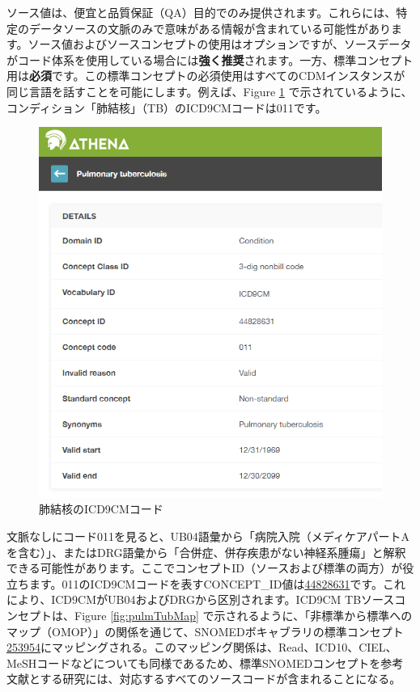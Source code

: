 \documentclass[
  11pt]{book}
\theoremstyle{definition}
\theoremstyle{definition}
\theoremstyle{definition}
\theoremstyle{definition}
\theoremstyle{remark}
\begin{document}
ソース値は、便宜と品質保証（QA）目的でのみ提供されます。これらには、特定のデータソースの文脈のみで意味がある情報が含まれている可能性があります。ソース値およびソースコンセプトの使用はオプションですが、ソースデータがコード体系を使用している場合には\textbf{強く推奨}されます。一方、標準コンセプト用は\textbf{必須}です。この標準コンセプトの必須使用はすべてのCDMインスタンスが同じ言語を話すことを可能にします。例えば、Figure \ref{fig:pulmTubICD9} で示されているように、コンディション「肺結核」（TB）のICD9CMコードは011です。

\begin{figure}

{\centering \includegraphics[width=0.75\linewidth]{images/CommonDataModel/pulmTubICD9} 

}

\caption{肺結核のICD9CMコード}\label{fig:pulmTubICD9}
\end{figure}

文脈なしにコード011を見ると、UB04語彙から「病院入院（メディケアパートAを含む）」、またはDRG語彙から「合併症、併存疾患がない神経系腫瘍」と解釈できる可能性があります。ここでコンセプトID（ソースおよび標準の両方）が役立ちます。011のICD9CMコードを表すCONCEPT\_ID値は\href{http://athena.ohdsi.org/search-terms/terms/44828631}{44828631}です。これにより、ICD9CMがUB04およびDRGから区別されます。ICD9CM TBソースコンセプトは、Figure \ref{fig:pulmTubMap} で示されるように、「非標準から標準へのマップ（OMOP）」の関係を通じて、SNOMEDボキャブラリの標準コンセプト \href{http://athena.ohdsi.org/search-terms/terms/253954}{253954}にマッピングされる。このマッピング関係は、Read、ICD10、CIEL、MeSHコードなどについても同様であるため、標準SNOMEDコンセプトを参考文献とする研究には、対応するすべてのソースコードが含まれることになる。
\end{document}
